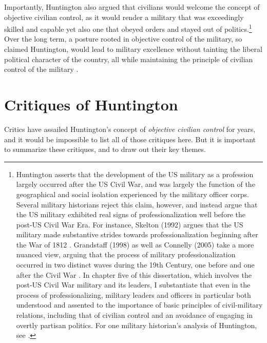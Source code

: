 \documentclass[
  12pt,
  oneside]{memoir}
\begin{document}
Importantly, Huntington also argued that civilians would welcome the concept of objective civilian control, as it would render a military that was exceedingly skilled and capable yet also one that obeyed orders and stayed out of politics.\footnote{Huntington asserts that the development of the US military as a profession largely occurred after the US Civil War, and was largely the function of the geographical and social isolation experienced by the military officer corps. Several military historians reject this claim, however, and instead argue that the US military exhibited real signs of professionalization well before the post-US Civil War Era. For instance, Skelton (1992) argues that the US military made substantive strides towards professionalization beginning after the War of 1812 \autocites{skelton_american_1992}[see also][]{heiss_professionalization_2012}. Grandstaff (1998) as well as Connelly (2005) take a more nuanced view, arguing that the process of military professionalization occurred in two distinct waves during the 19th Century, one before and one after the Civil War \autocite{grandstaff_preserving_1998,connelly_american_2005}. In chapter five of this dissertation, which involves the post-US Civil War military and its leaders, I substantiate that even in the process of professionalizing, military leaders and officers in particular both understood and assented to the importance of basic principles of civil-military relations, including that of civilian control and an avoidance of engaging in overtly partisan politics. For one military historian's analysis of Huntington, see \textcite{coffman_long_1991}.} Over the long term, a posture rooted in objective control of the military, so claimed Huntington, would lead to military excellence without tainting the liberal political character of the country, all while maintaining the principle of civilian control of the military \autocite[83-85]{huntington_soldier_1957}.

\hypertarget{critiques-of-huntington}{%
\section{Critiques of Huntington}\label{critiques-of-huntington}}

Critics have assailed Huntington's concept of \emph{objective civilian control} for years, and it would be impossible to list all of those critiques here. But it is important to summarize these critiques, and to draw out their key themes.
\end{document}
